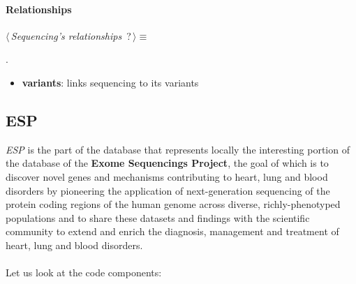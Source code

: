 \paragraph{Relationships} 

	\begin{flushleft} \small
\begin{minipage}{\linewidth}\label{scrap11}\raggedright\small
{} $\langle\,${\itshape {Sequencing's relationships}}\nobreak\ {\footnotesize {?}}$\,\rangle\equiv$
\vspace{-1ex}
\begin{list}{}{} \item

                
        {\NWsep}
\end{list}
\vspace{-1.5ex}
\footnotesize
\begin{list}{}{\setlength{\itemsep}{-\parsep}\setlength{\itemindent}{-\leftmargin}}
\item {\NWtxtMacroNoRef}.

\item{}
\end{list}
\end{minipage}\vspace{4ex}
\end{flushleft}
\begin{itemize}
 	\item \textbf{variants}: links sequencing to its variants
\end{itemize}


\subsection{ESP}
\emph{ESP} is the part of the database that represents locally the interesting portion of the database of the \textbf{Exome Sequencings Project}, the goal of which is to discover novel genes and mechanisms contributing to heart, lung and blood disorders by pioneering the application of next-generation sequencing of the protein coding regions of the human genome across diverse, richly-phenotyped populations and to share these datasets and findings with the scientific community to extend and enrich the diagnosis, management and treatment of heart, lung and blood disorders.
\\
\\Let us look at the code components:

